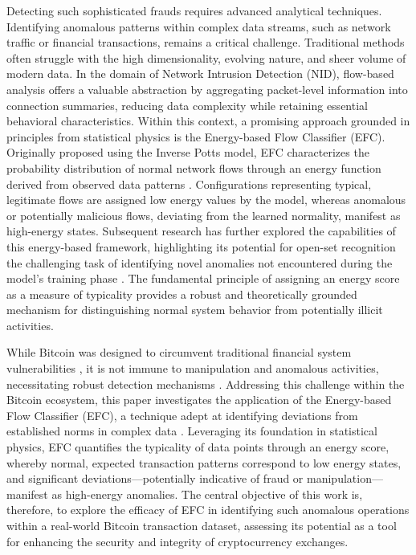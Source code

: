 \documentclass[12pt]{article}
\begin{document}
Detecting such sophisticated frauds requires advanced analytical techniques. Identifying anomalous patterns within complex
data streams, such as network traffic or financial transactions, remains a
critical challenge. Traditional methods often struggle with the high dimensionality, evolving nature, and sheer volume
of modern data. In the domain of Network Intrusion Detection (NID), flow-based analysis offers a valuable abstraction by
aggregating packet-level information into connection summaries, reducing data complexity while retaining essential
behavioral characteristics. Within this context, a promising approach grounded in principles from statistical physics
is the Energy-based Flow Classifier (EFC). Originally proposed using the Inverse Potts model, EFC characterizes the
probability distribution of normal network flows through an energy function derived from observed data patterns
\cite{pontes2019}. Configurations representing typical, legitimate flows are assigned low energy values by the model,
whereas anomalous or potentially malicious flows, deviating from the learned normality, manifest as high-energy states.
Subsequent research has further explored the capabilities of this energy-based framework, highlighting its potential for
open-set recognition the challenging task of identifying novel anomalies not encountered during the model's training
phase \cite{souza2022novelopensetenergybased}. The fundamental principle of assigning an energy score as a measure of typicality provides a
robust and theoretically grounded mechanism for distinguishing normal system behavior from potentially illicit activities.

While Bitcoin was designed to circumvent traditional financial system vulnerabilities \cite{nakamoto2008bitcoin}, it is
not immune to manipulation and anomalous activities, necessitating robust detection mechanisms \cite{zhang2020financial,
zainal2018review}. Addressing this challenge within the Bitcoin ecosystem, this paper investigates the application of the
Energy-based Flow Classifier (EFC), a technique adept at identifying deviations from established norms in complex data
\cite{pontes2019, souza2022novelopensetenergybased}. Leveraging its foundation in statistical physics, EFC quantifies the typicality of
data points through an energy score, whereby normal, expected transaction patterns correspond to low energy states, and
significant deviations—potentially indicative of fraud or manipulation—manifest as high-energy anomalies. The central
objective of this work is, therefore, to explore the efficacy of EFC in identifying such anomalous operations within a
real-world Bitcoin transaction dataset, assessing its potential as a tool for enhancing the security and integrity of
cryptocurrency exchanges.




\end{document}
